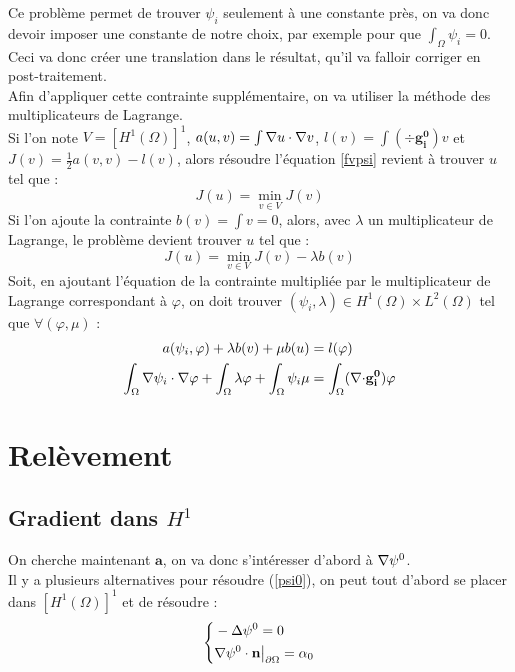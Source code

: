 Ce problème permet de trouver $\psi_i$ seulement à une constante près, on va donc devoir imposer une constante de notre choix, par exemple pour que $\int_\Omega \psi_i = 0$. Ceci va donc créer une translation dans le résultat, qu'il va falloir corriger en post-traitement.\\
Afin d'appliquer cette contrainte supplémentaire, on va utiliser la méthode des multiplicateurs de Lagrange.\\
Si l'on note $V=[H^1(\Omega)]^1$, $a(u,v)=\int {\nabla} u \cdot {\nabla} v$, $l(v)=\int (\div \mathbf{g_i^0})v$ et $J(v)=\frac{1}{2}a(v,v)-l(v)$, alors résoudre l'équation \ref{fvpsi} revient à trouver $u$ tel que :
\[ J(u) = \min_{v\in V} J(v) \]
Si l'on ajoute la contrainte $b(v) = \int v = 0$, alors, avec $\lambda$ un multiplicateur de Lagrange, le problème devient trouver $u$ tel que :
\[ J(u) = \min_{v\in V} J(v) - \lambda b(v) \]
Soit, en ajoutant l'équation de la contrainte multipliée par le multiplicateur de Lagrange correspondant à $\varphi$, on doit trouver $(\psi_i,\lambda)\in H^1(\Omega)\times L^2(\Omega)$ tel que $\forall (\varphi,\mu)$ :
\begin{align}\label{fvpsiml}
a(\psi_i,\varphi) + \lambda b(v) + \mu b(u) &= l(\varphi) \notag \\
\int_\Omega {\nabla}\psi_i\cdot{\nabla}\varphi + \int_\Omega \lambda\varphi + \int_\Omega \psi_i\mu &= \int_\Omega ({\nabla\cdot} \mathbf{g_i^0})\varphi
\end{align}
\fi
\section{Relèvement}
\label{relev}

\subsection{Gradient dans $H^1$}
\label{secpsi0hdiv} \label{multLagrange}

On cherche maintenant $\mathbf{a}$, on va donc s'intéresser d'abord à ${\nabla}\psi^0$.\\
Il y a plusieurs alternatives pour résoudre (\ref{psi0}), on peut tout d'abord se placer dans $[H^1(\Omega)]^1$ et de résoudre :
\begin{equation}\label{pbpsi0}
\left\{\begin{aligned}
&-{\Delta}\psi^0 = 0\\
&{\nabla}\psi^0\cdot \mathbf{n}{\big\rvert_{\partial\Omega}}=\alpha_0
\end{aligned}\right.
\end{equation}

